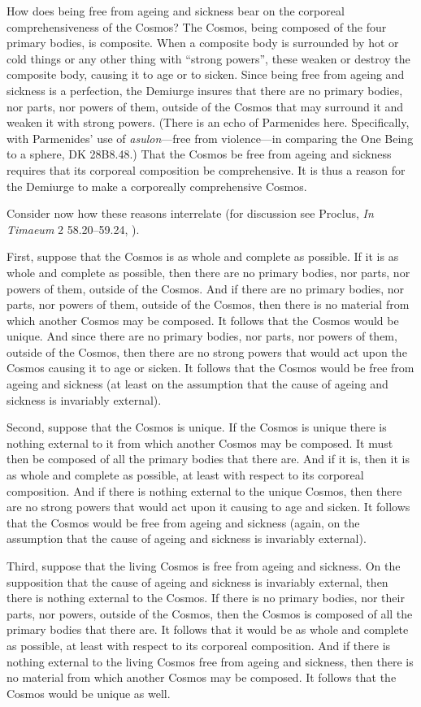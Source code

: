 How does being free from ageing and sickness bear on the corporeal comprehensiveness of the Cosmos? The Cosmos, being composed of the four primary bodies, is composite. When a composite body is surrounded by hot or cold things or any other thing with ``strong powers'', these weaken or destroy the composite body, causing it to age or to sicken. Since being free from ageing and sickness is a perfection, the Demiurge insures that there are no primary bodies, nor parts, nor powers of them, outside of the Cosmos that may surround it and weaken it with strong powers. (There is an echo of Parmenides here. Specifically, with Parmenides' use of \emph{asulon}---free from violence---in comparing the One Being to a sphere, DK 28B8.48.) That the Cosmos be free from ageing and sickness requires that its corporeal composition be comprehensive. It is thus a reason for the Demiurge to make a corporeally comprehensive Cosmos.

Consider now how these reasons interrelate (for discussion see Proclus, \emph{In Timaeum} 2 58.20--59.24, \citealt{Diehl:1903re}). 

First, suppose that the Cosmos is as whole and complete as possible. If it is as whole and complete as possible, then there are no primary bodies, nor parts, nor powers of them, outside of the Cosmos. And if there are no primary bodies, nor parts, nor powers of them, outside of the Cosmos, then there is no material from which another Cosmos may be composed. It follows that the Cosmos would be unique. And since there are no primary bodies, nor parts, nor powers of them, outside of the Cosmos, then there are no strong powers that would act upon the Cosmos causing it to age or sicken. It follows that the Cosmos would be free from ageing and sickness (at least on the assumption that the cause of ageing and sickness is invariably external).

Second, suppose that the Cosmos is unique. If the Cosmos is unique there is nothing external to it from which another Cosmos may be composed. It must then be composed of all the primary bodies that there are. And if it is, then it is as whole and complete as possible, at least with respect to its corporeal composition. And if there is nothing external to the unique Cosmos, then there are no strong powers that would act upon it causing to age and sicken. It follows that the Cosmos would be free from ageing and sickness (again, on the assumption that the cause of ageing and sickness is invariably external).

Third, suppose that the living Cosmos is free from ageing and sickness. On the supposition that the cause of ageing and sickness is invariably external, then there is nothing external to the Cosmos. If there is no primary bodies, nor their parts, nor powers, outside of the Cosmos, then the Cosmos is composed of all the primary bodies that there are. It follows that it would be as whole and complete as possible, at least with respect to its corporeal composition. And if there is nothing external to the living Cosmos free from ageing and sickness, then there is no material from which another Cosmos may be composed. It follows that the Cosmos would be unique as well.

